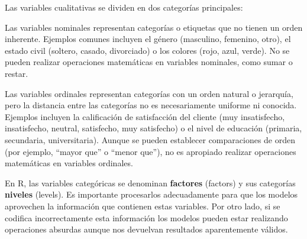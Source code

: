 \documentclass[
  letterpaper,
  DIV=11,
  numbers=noendperiod]{scrreprt}
\begin{document}
Las variables cualitativas se dividen en dos categorías principales:

\begin{tcolorbox}[enhanced jigsaw, arc=.35mm, breakable, coltitle=black, left=2mm, opacityback=0, bottomtitle=1mm, colbacktitle=quarto-callout-note-color!10!white, title=\textcolor{quarto-callout-note-color}{\faInfo}\hspace{0.5em}{Variables Cualitativas Nominales}, titlerule=0mm, colback=white, colframe=quarto-callout-note-color-frame, bottomrule=.15mm, rightrule=.15mm, opacitybacktitle=0.6, toptitle=1mm, toprule=.15mm, leftrule=.75mm]

Las variables nominales representan categorías o etiquetas que no tienen
un orden inherente. Ejemplos comunes incluyen el género (masculino,
femenino, otro), el estado civil (soltero, casado, divorciado) o los
colores (rojo, azul, verde). No se pueden realizar operaciones
matemáticas en variables nominales, como sumar o restar.

\end{tcolorbox}

\begin{tcolorbox}[enhanced jigsaw, arc=.35mm, breakable, coltitle=black, left=2mm, opacityback=0, bottomtitle=1mm, colbacktitle=quarto-callout-note-color!10!white, title=\textcolor{quarto-callout-note-color}{\faInfo}\hspace{0.5em}{Variables Cualitativas Ordinales}, titlerule=0mm, colback=white, colframe=quarto-callout-note-color-frame, bottomrule=.15mm, rightrule=.15mm, opacitybacktitle=0.6, toptitle=1mm, toprule=.15mm, leftrule=.75mm]

Las variables ordinales representan categorías con un orden natural o
jerarquía, pero la distancia entre las categorías no es necesariamente
uniforme ni conocida. Ejemplos incluyen la calificación de satisfacción
del cliente (muy insatisfecho, insatisfecho, neutral, satisfecho, muy
satisfecho) o el nivel de educación (primaria, secundaria,
universitaria). Aunque se pueden establecer comparaciones de orden (por
ejemplo, ``mayor que'' o ``menor que''), no es apropiado realizar
operaciones matemáticas en variables ordinales.

\end{tcolorbox}

En R, las variables categóricas se denominan \textbf{factores} (factors)
y sus categorías \textbf{niveles} (levels). Es importante procesarlos
adecuadamente para que los modelos aprovechen la información que
contienen estas variables. Por otro lado, si se codifica incorrectamente
esta información los modelos pueden estar realizando operaciones
absurdas aunque nos devuelvan resultados aparentemente válidos.
\end{document}

